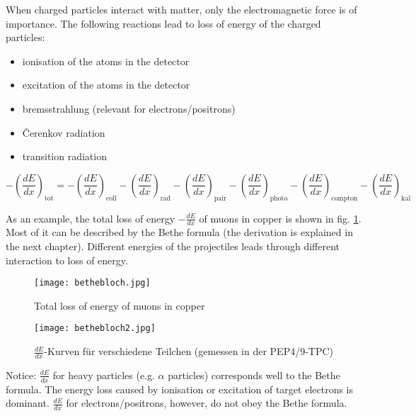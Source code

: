 When charged particles interact with matter, only the electromagnetic force is of importance. The
following reactions lead to loss of energy of the charged particles:

\begin{itemize}
  \item ionisation of the atoms in the detector
  \item excitation of the atoms in the detector
  \item bremsstrahlung (relevant for electrons/positrons)
  \item \v{C}erenkov radiation
  \item transition radiation
\end{itemize}

\[-\left(\frac{dE}{dx}\right)_{\text{tot}} = -\left(\frac{dE}{dx}\right)_{\text{coll}}
-\left(\frac{dE}{dx}\right)_{\text{rad}} -\left(\frac{dE}{dx}\right)_{\text{pair}}
-\left(\frac{dE}{dx}\right)_{\text{photo}} -\left(\frac{dE}{dx}\right)_{\text{compton}}
-\left(\frac{dE}{dx}\right)_{\text{kal}}\]

As an example, the total loss of energy $-\frac{dE}{dx}$ of muons in copper is shown in fig.
\ref{enenergylossInCopper}. Most of it can be described by the Bethe formula (the derivation is
explained in the next chapter). Different energies of the projectiles leads through different
interaction to loss of energy.

\begin{figure}[H]
	\centering
	\texttt{[image: bethebloch.jpg]}
	\caption{Total loss of energy of muons in copper}
	\label{enenergylossInCopper}
\end{figure}

\begin{figure}[H]
	\centering
	\texttt{[image: bethebloch2.jpg]}
	\caption{$\frac{dE}{dx}$-Kurven für verschiedene Teilchen (gemessen in der
	PEP4/9-TPC)}
	\label{}
\end{figure}

Notice: $\frac{dE}{dx}$ for heavy particles (e.g. $\alpha$ particles) corresponds well to the Bethe
formula. The energy loss caused by ionisation or excitation of target electrons is dominant.
$\frac{dE}{dx}$ for electrons/positrons, however, do not obey the Bethe formula.
